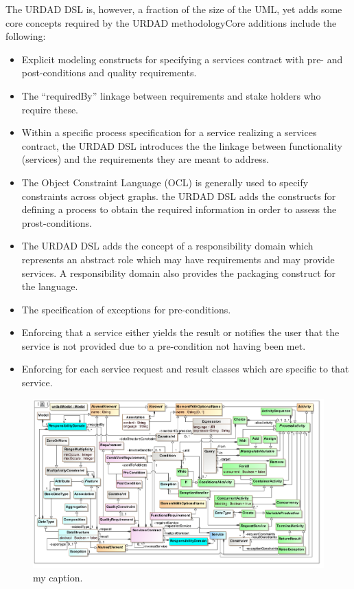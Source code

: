 The URDAD DSL is, however, a fraction of the size of the UML, yet adds some core concepts required by the URDAD methodologyCore additions include the following:
\begin{itemize}
  \item Explicit modeling constructs for specifying a services contract with pre- and post-conditions and quality requirements.
  \item The ``requiredBy'' linkage between requirements and stake holders who require these.
  \item Within a specific process specification for a service realizing a services contract, the URDAD DSL introduces the the linkage between functionality (services) and the requirements they are meant to address. 
  \item The Object Constraint Language (OCL) is generally used to specify constraints across object graphs. the URDAD DSL adds the constructs for defining a process to obtain the required information in order to assess the prost-conditions.
  \item The URDAD DSL adds the concept of a responsibility domain which represents an abstract role which may have requirements and may provide services. A responsibility domain also provides the packaging construct for the language.
  \item The specification of exceptions for pre-conditions.
  \item Enforcing that a service either yields the result or notifies the user that the service is not provided due to a pre-condition not having been met.
  \item Enforcing for each service request and result classes which are specific to that service.
\end{itemize}


\begin{figure}
  \centering
  \includegraphics{metamodel}
  \caption{my caption.}
  \label{fig:metamodel}
\end{figure}
         





